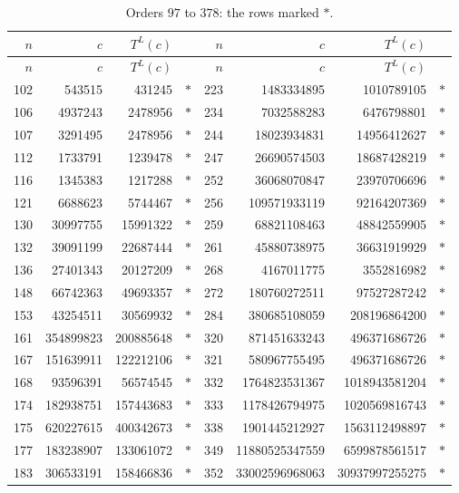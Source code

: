\documentclass[10pt,a4paper,titlepage]{article}
\newif\ifpaper
\theoremstyle{plain}
\theoremstyle{definition}
\theoremstyle{remark}
\begin{document}
\ifpaper\clearpage\fi
{\footnotesize\setlength{\extrarowheight}{1pt}
\begin{longtable}{|r|r|rc||r|r|rc|}
\caption{Orders $97$ to $378$: the rows marked $\ast$.}\label{tab:bests2}\\
\hline
$n$ & $c$ & $T^L(c)$ & & $n$ & $c$ & $T^L(c)$ & \\
\hline
\endfirsthead
\hline
$n$ & $c$ & $T^L(c)$ & & $n$ & $c$ & $T^L(c)$ & \\
\hline
\endhead
102 & 543515 & 431245 & $\ast$ & 223 & 1483334895 & 1010789105 & $\ast$ \\
106 & 4937243 & 2478956 & $\ast$ & 234 & 7032588283 & 6476798801 & $\ast$ \\
107 & 3291495 & 2478956 & $\ast$ & 244 & 18023934831 & 14956412627 & $\ast$ \\
112 & 1733791 & 1239478 & $\ast$ & 247 & 26690574503 & 18687428219 & $\ast$ \\
116 & 1345383 & 1217288 & $\ast$ & 252 & 36068070847 & 23970706696 & $\ast$ \\
121 & 6688623 & 5744467 & $\ast$ & 256 & 109571933119 & 92164207369 & $\ast$ \\
130 & 30997755 & 15991322 & $\ast$ & 259 & 68821108463 & 48842559905 & $\ast$ \\
132 & 39091199 & 22687444 & $\ast$ & 261 & 45880738975 & 36631919929 & $\ast$ \\
136 & 27401343 & 20127209 & $\ast$ & 268 & 4167011775 & 3552816982 & $\ast$ \\
148 & 66742363 & 49693357 & $\ast$ & 272 & 180760272511 & 97527287242 & $\ast$ \\
153 & 43254511 & 30569932 & $\ast$ & 284 & 380685108059 & 208196864200 & $\ast$ \\
161 & 354899823 & 200885648 & $\ast$ & 320 & 871451633243 & 496371686726 & $\ast$ \\
167 & 151639911 & 122212106 & $\ast$ & 321 & 580967755495 & 496371686726 & $\ast$ \\
168 & 93596391 & 56574545 & $\ast$ & 332 & 1764823531367 & 1018943581204 & $\ast$ \\
174 & 182938751 & 157443683 & $\ast$ & 333 & 1178426794975 & 1020569816743 & $\ast$ \\
175 & 620227615 & 400342673 & $\ast$ & 338 & 1901445212927 & 1563112498897 & $\ast$ \\
177 & 183238907 & 133061072 & $\ast$ & 349 & 11880525347559 & 6599878561517 & $\ast$ \\
183 & 306533191 & 158466836 & $\ast$ & 352 & 33002596968063 & 30937997255275 & $\ast$ \\

\end{longtable}}
\end{document}

